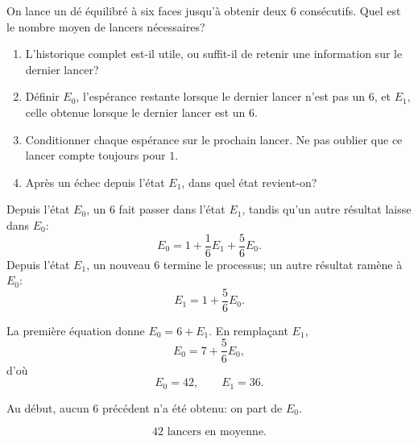 \documentclass[11pt,a4paper]{article}
\begin{document}

\begin{statementbox}
On lance un dé équilibré à six faces jusqu'à obtenir deux $6$ consécutifs.
Quel est le nombre moyen de lancers nécessaires?
\end{statementbox}

\begin{hintsbox}
\begin{enumerate}
  \item L'historique complet est-il utile, ou suffit-il de retenir une
  information sur le dernier lancer?
  \item Définir $E_0$, l'espérance restante lorsque le dernier lancer n'est
  pas un $6$, et $E_1$, celle obtenue lorsque le dernier lancer est un $6$.
  \item Conditionner chaque espérance sur le prochain lancer. Ne pas oublier
  que ce lancer compte toujours pour $1$.
  \item Après un échec depuis l'état $E_1$, dans quel état revient-on?
\end{enumerate}
\end{hintsbox}

\correction

Depuis l'état $E_0$, un $6$ fait passer dans l'état $E_1$, tandis qu'un autre
résultat laisse dans $E_0$:
\[
E_0=1+\frac16E_1+\frac56E_0.
\]
Depuis l'état $E_1$, un nouveau $6$ termine le processus; un autre résultat
ramène à $E_0$:
\[
E_1=1+\frac56E_0.
\]

La première équation donne $E_0=6+E_1$. En remplaçant $E_1$,
\[
E_0=7+\frac56E_0,
\]
d'où
\[
E_0=42,
\qquad
E_1=36.
\]

Au début, aucun $6$ précédent n'a été obtenu: on part de $E_0$.

\begin{resultbox}
\[
\boxed{42\text{ lancers en moyenne}.}
\]
\end{resultbox}
\end{document}
